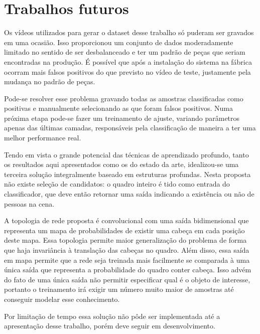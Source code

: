 \section*{Trabalhos futuros}

Os vídeos utilizados para gerar o dataset desse trabalho só puderam ser gravados em uma ocasião. Isso proporcionou um conjunto de dados moderadamente limitado no sentido de ser desbalanceado e ter um padrão de peças que seriam encontradas na produção. É possível que após a instalação do sistema na fábrica ocorram mais falsos positivos do que previsto no vídeo de teste, justamente pela mudança no padrão de peças.

Pode-se resolver esse problema gravando todas as amostras classificadas como positivas e manualmente selecionando as que foram falsos positivos. Numa próxima etapa pode-se fazer um treinamento de ajuste, variando parâmetros apenas das últimas camadas, responsáveis pela classificação de maneira a ter uma melhor performance real.

Tendo em vista o grande potencial das técnicas de aprendizado profundo, tanto os resultados aqui apresentados como os do estado da arte, idealizou-se uma terceira solução integralmente baseado em estruturas profundas. Nesta proposta não existe seleção de candidatos: o quadro inteiro é tido como entrada do classificador, que deve então retornar uma saída indicando a existência ou não de pessoas na cena.

A topologia de rede proposta é convolucional com uma saída bidimensional que representa um mapa de probabilidades de existir uma cabeça em cada posição deste mapa. Essa topologia permite maior generalização do problema de forma que haja invariância à translação das cabeças no quadro. Além disso, essa saída em mapa permite que a rede seja treinada mais facilmente se comparada à uma única saída que representa a probabilidade do quadro conter cabeça. Isso advém do fato de uma única saída não permitir especificar qual é o objeto de interesse, portanto o treinamento irá exigir um número muito maior de amostras até conseguir modelar esse conhecimento.

Por limitação de tempo essa solução não pôde ser implementada até a apresentação desse trabalho, porém deve seguir em desenvolvimento.
